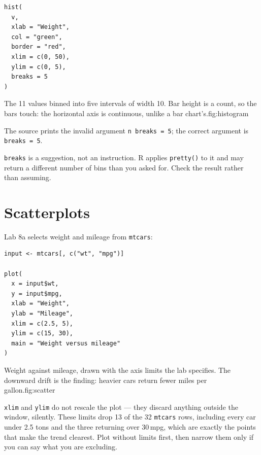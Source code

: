 \begin{lstlisting}[style=dsr]
hist(
  v,
  xlab = "Weight",
  col = "green",
  border = "red",
  xlim = c(0, 50),
  ylim = c(0, 5),
  breaks = 5
)
\end{lstlisting}

\begin{utpfig}[Histogram]{The 11 values binned into five intervals of width 10.
Bar height is a count, so the bars touch: the horizontal axis is continuous,
unlike a bar chart's.}{fig:histogram}

\end{utpfig}

\begin{pitfall}
The source prints the invalid argument \texttt{n breaks = 5}; the correct argument is \texttt{breaks = 5}.

\texttt{breaks} is a suggestion, not an instruction. R applies
\texttt{pretty()} to it and may return a different number of bins than you
asked for. Check the result rather than assuming.
\end{pitfall}

\section{Scatterplots}

Lab 8a selects weight and mileage from \texttt{mtcars}:

\begin{lstlisting}[style=dsr]
input <- mtcars[, c("wt", "mpg")]

plot(
  x = input$wt,
  y = input$mpg,
  xlab = "Weight",
  ylab = "Mileage",
  xlim = c(2.5, 5),
  ylim = c(15, 30),
  main = "Weight versus mileage"
)
\end{lstlisting}

\begin{utpfig}[Scatterplot]{Weight against mileage, drawn with the axis limits
the lab specifies. The downward drift is the finding: heavier cars return fewer
miles per gallon.}{fig:scatter}

\end{utpfig}

\begin{pitfall}
\texttt{xlim} and \texttt{ylim} do not rescale the plot --- they discard
anything outside the window, silently. These limits drop 13 of the 32
\texttt{mtcars} rows, including every car under 2.5 tons and the three
returning over 30\,mpg, which are exactly the points that make the trend
clearest. Plot without limits first, then narrow them only if you can say
what you are excluding.
\end{pitfall}

